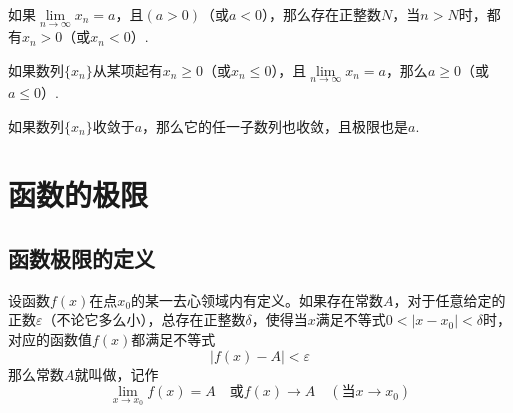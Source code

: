 \documentclass[lang=cn,10pt]{elegantbook}
\begin{document}
\begin{theorem}[收敛数列的保号性]
	如果\( \lim\limits_{n \to \infty} x_{n} = a \)，且\( (a > 0) \)（或\( a < 0 \)），那么存在正整数\( N \)，当\( n > N \)时，都有\( x_{n} > 0 \)（或\( x_{n} < 0 \)）.
\end{theorem}

\begin{corollary}
	如果数列\( \{x_{n}\} \)从某项起有\( x_{n} \geqslant 0 \)（或\( x_{n} \leqslant 0 \)），且\( \lim\limits_{n \to \infty} x_{n} = a \)，那么\( a \geqslant 0 \)（或\(  a \leqslant 0 \)）.
\end{corollary}

\begin{theorem}[收敛数列与其子数列间的关系]
	如果数列\( \{x_{n}\} \)收敛于\( a \)，那么它的任一子数列也收敛，且极限也是\( a \).
\end{theorem}

\section{函数的极限}
\subsection{函数极限的定义}

\begin{definition}[函数极限]
	\label{def:fctlim1}
	设函数\( f(x) \)在点\( x_{0} \)的某一去心领域内有定义。如果存在常数\( A \)，对于任意给定的正数\( \varepsilon \)（不论它多么小），总存在正整数\( \delta \)，使得当\( x \)满足不等式\( 0 < |x - x_{0}| < \delta \)时，对应的函数值\( f(x) \)都满足不等式
	\[ |f(x) - A| < \varepsilon \]
	那么常数\( A \)就叫做，记作
	\[ \lim_{x \to x_{0}}f(x) = A\quad \text{或} f(x) \rightarrow A\quad (\text{当}x \rightarrow x_{0}) \]
\end{definition}
\end{document}
